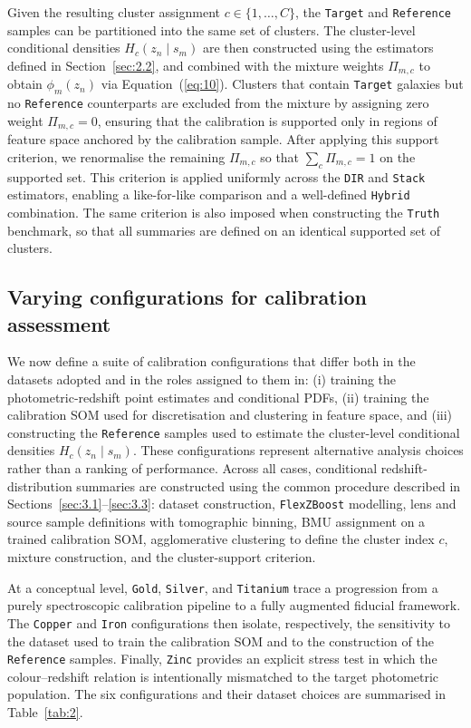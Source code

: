 Given the resulting cluster assignment \(c \in \{1, \ldots, C\}\), the \texttt{Target} and \texttt{Reference} samples can be partitioned into the same set of clusters. The cluster-level conditional densities \(H_c(z_n \mid s_m)\) are then constructed using the estimators defined in Section~\ref{sec:2.2}, and combined with the mixture weights \(\Pi_{m,c}\) to obtain \(\phi_m(z_n)\) via Equation~(\ref{eq:10}). Clusters that contain \texttt{Target} galaxies but no \texttt{Reference} counterparts are excluded from the mixture by assigning zero weight \(\Pi_{m,c}=0\), ensuring that the calibration is supported only in regions of feature space anchored by the calibration sample. After applying this support criterion, we renormalise the remaining \(\Pi_{m,c}\) so that \(\sum_c \Pi_{m,c}=1\) on the supported set. This criterion is applied uniformly across the \texttt{DIR} and \texttt{Stack} estimators, enabling a like-for-like comparison and a well-defined \texttt{Hybrid} combination. The same criterion is also imposed when constructing the \texttt{Truth} benchmark, so that all summaries are defined on an identical supported set of clusters.

\subsection{Varying configurations for calibration assessment} \label{sec:3.4}

We now define a suite of calibration configurations that differ both in the datasets adopted and in the roles assigned to them in: (i) training the photometric-redshift point estimates and conditional PDFs, (ii) training the calibration SOM used for discretisation and clustering in feature space, and (iii) constructing the \texttt{Reference} samples used to estimate the cluster-level conditional densities \(H_c(z_n \mid s_m)\). These configurations represent alternative analysis choices rather than a ranking of performance. Across all cases, conditional redshift-distribution summaries are constructed using the common procedure described in Sections~\ref{sec:3.1}--\ref{sec:3.3}: dataset construction, \texttt{FlexZBoost} modelling, lens and source sample definitions with tomographic binning, BMU assignment on a trained calibration SOM, agglomerative clustering to define the cluster index \(c\), mixture construction, and the cluster-support criterion.

At a conceptual level, \texttt{Gold}, \texttt{Silver}, and \texttt{Titanium} trace a progression from a purely spectroscopic calibration pipeline to a fully augmented fiducial framework. The \texttt{Copper} and \texttt{Iron} configurations then isolate, respectively, the sensitivity to the dataset used to train the calibration SOM and to the construction of the \texttt{Reference} samples. Finally, \texttt{Zinc} provides an explicit stress test in which the colour--redshift relation is intentionally mismatched to the target photometric population. The six configurations and their dataset choices are summarised in Table~\ref{tab:2}.

